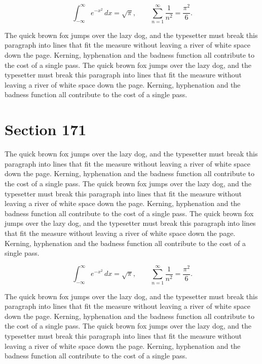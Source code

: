 \documentclass{article}
\begin{document}
\begin{equation}
\int_{-\infty}^{\infty} e^{-x^{2}}\,dx = \sqrt{\pi}, \qquad
\sum_{n=1}^{\infty} \frac{1}{n^{2}} = \frac{\pi^{2}}{6}.
\end{equation}

The quick brown fox jumps over the lazy dog, and the typesetter must break this paragraph into lines that fit the measure without leaving a river of white space down the page. Kerning, hyphenation and the badness function all contribute to the cost of a single pass. The quick brown fox jumps over the lazy dog, and the typesetter must break this paragraph into lines that fit the measure without leaving a river of white space down the page. Kerning, hyphenation and the badness function all contribute to the cost of a single pass. 
\section{Section 171}
The quick brown fox jumps over the lazy dog, and the typesetter must break this paragraph into lines that fit the measure without leaving a river of white space down the page. Kerning, hyphenation and the badness function all contribute to the cost of a single pass. The quick brown fox jumps over the lazy dog, and the typesetter must break this paragraph into lines that fit the measure without leaving a river of white space down the page. Kerning, hyphenation and the badness function all contribute to the cost of a single pass. The quick brown fox jumps over the lazy dog, and the typesetter must break this paragraph into lines that fit the measure without leaving a river of white space down the page. Kerning, hyphenation and the badness function all contribute to the cost of a single pass. 

\begin{equation}
\int_{-\infty}^{\infty} e^{-x^{2}}\,dx = \sqrt{\pi}, \qquad
\sum_{n=1}^{\infty} \frac{1}{n^{2}} = \frac{\pi^{2}}{6}.
\end{equation}

The quick brown fox jumps over the lazy dog, and the typesetter must break this paragraph into lines that fit the measure without leaving a river of white space down the page. Kerning, hyphenation and the badness function all contribute to the cost of a single pass. The quick brown fox jumps over the lazy dog, and the typesetter must break this paragraph into lines that fit the measure without leaving a river of white space down the page. Kerning, hyphenation and the badness function all contribute to the cost of a single pass. 
\end{document}
